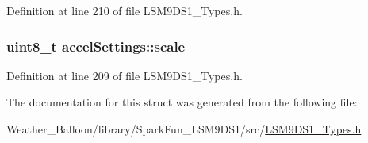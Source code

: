 Definition at line 210 of file L\+S\+M9\+D\+S1\+\_\+\+Types.\+h.

\subsubsection[{\texorpdfstring{scale}{scale}}]{\setlength{\rightskip}{0pt plus 5cm}uint8\+\_\+t accel\+Settings\+::scale}\hypertarget{structaccel_settings_a3a0a38e5e32ad21fcf8e880f37c0de1e}{}\label{structaccel_settings_a3a0a38e5e32ad21fcf8e880f37c0de1e}


Definition at line 209 of file L\+S\+M9\+D\+S1\+\_\+\+Types.\+h.



The documentation for this struct was generated from the following file\+:\begin{DoxyCompactItemize}
\item 
Weather\+\_\+\+Balloon/library/\+Spark\+Fun\+\_\+\+L\+S\+M9\+D\+S1/src/\hyperlink{_l_s_m9_d_s1___types_8h}{L\+S\+M9\+D\+S1\+\_\+\+Types.\+h}\end{DoxyCompactItemize}
